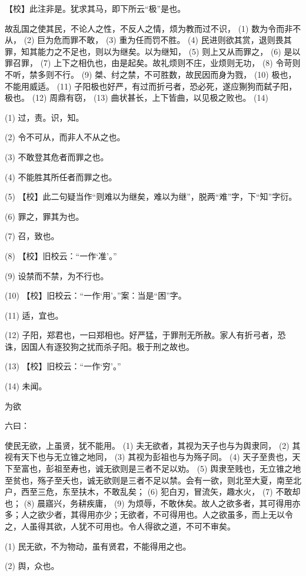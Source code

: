 \documentclass[12pt,UTF8]{ctexbook}
\begin{document}
【校】此注非是。犹求其马，即下所云“极”是也。

故乱国之使其民，不论人之性，不反人之情，烦为教而过不识， (1) 数为令而非不从， (2) 巨为危而罪不敢， (3) 重为任而罚不胜。 (4) 民进则欲其赏，退则畏其罪，知其能力之不足也，则以为继矣。以为继知， (5) 则上又从而罪之， (6) 是以罪召罪， (7) 上下之相仇也，由是起矣。故礼烦则不庄，业烦则无功， (8) 令苛则不听，禁多则不行。 (9) 桀、纣之禁，不可胜数，故民因而身为戮， (10) 极也，不能用威适。 (11) 子阳极也好严，有过而折弓者，恐必死，遂应猘狗而弑子阳，极也。 (12) 周鼎有窃， (13) 曲状甚长，上下皆曲，以见极之败也。 (14)

(1) 过，责。识，知。

(2) 令不可从，而非人不从之也。

(3) 不敢登其危者而罪之也。

(4) 不能胜其所任者而罪之也。

(5) 【校】此二句疑当作“则难以为继矣，难以为继”，脱两“难”字，下“知”字衍。

(6) 罪之，罪其为也。

(7) 召，致也。

(8) 【校】旧校云：“一作‘准’。”

(9) 设禁而不禁，为不行也。

(10) 【校】旧校云：“一作‘用’。”案：当是“困”字。

(11) 适，宜也。

(12) 子阳，郑君也，一曰郑相也。好严猛，于罪刑无所赦。家人有折弓者，恐诛，因国人有逐狡狗之扰而杀子阳。极于刑之故也。

(13) 【校】旧校云：“一作‘穷’。”

(14) 未闻。





为欲


六曰：

使民无欲，上虽贤，犹不能用。 (1) 夫无欲者，其视为天子也与为舆隶同， (2) 其视有天下也与无立锥之地同， (3) 其视为彭祖也与为殇子同。 (4) 天子至贵也，天下至富也，彭祖至寿也，诚无欲则是三者不足以劝。 (5) 舆隶至贱也，无立锥之地至贫也，殇子至夭也，诚无欲则是三者不足以禁。会有一欲，则北至大夏，南至北户，西至三危，东至扶木，不敢乱矣； (6) 犯白刃，冒流矢，趣水火， (7) 不敢却也； (8) 晨寤兴，务耕疾庸， (9) 为烦辱，不敢休矣。故人之欲多者，其可得用亦多；人之欲少者，其得用亦少；无欲者，不可得用也。人之欲虽多，而上无以令之，人虽得其欲，人犹不可用也。令人得欲之道，不可不审矣。

(1) 民无欲，不为物动，虽有贤君，不能得用之也。

(2) 舆，众也。
\end{document}
